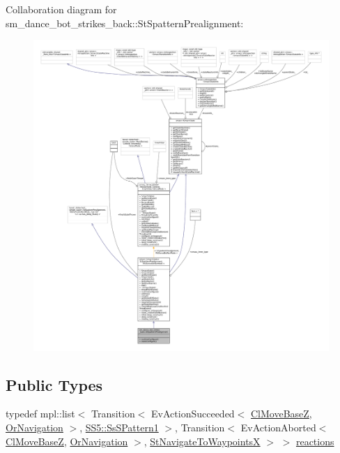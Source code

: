 Collaboration diagram for sm\+\_\+dance\+\_\+bot\+\_\+strikes\+\_\+back\+:\+:St\+Spattern\+Prealignment\+:
\nopagebreak
\begin{figure}[H]
\begin{center}
\leavevmode
\includegraphics[width=350pt]{structsm__dance__bot__strikes__back_1_1StSpatternPrealignment__coll__graph}
\end{center}
\end{figure}
\subsection*{Public Types}
\begin{DoxyCompactItemize}
\item 
typedef mpl\+::list$<$ Transition$<$ Ev\+Action\+Succeeded$<$ \hyperlink{classmove__base__z__client_1_1ClMoveBaseZ}{Cl\+Move\+BaseZ}, \hyperlink{classsm__dance__bot__strikes__back_1_1OrNavigation}{Or\+Navigation} $>$, \hyperlink{structsm__dance__bot__strikes__back_1_1SS5_1_1SsSPattern1}{S\+S5\+::\+Ss\+S\+Pattern1} $>$, Transition$<$ Ev\+Action\+Aborted$<$ \hyperlink{classmove__base__z__client_1_1ClMoveBaseZ}{Cl\+Move\+BaseZ}, \hyperlink{classsm__dance__bot__strikes__back_1_1OrNavigation}{Or\+Navigation} $>$, \hyperlink{structsm__dance__bot__strikes__back_1_1StNavigateToWaypointsX}{St\+Navigate\+To\+WaypointsX} $>$ $>$ \hyperlink{structsm__dance__bot__strikes__back_1_1StSpatternPrealignment_ac474c30f4538ff38707a3ce571a635a0}{reactions}
\end{DoxyCompactItemize}

